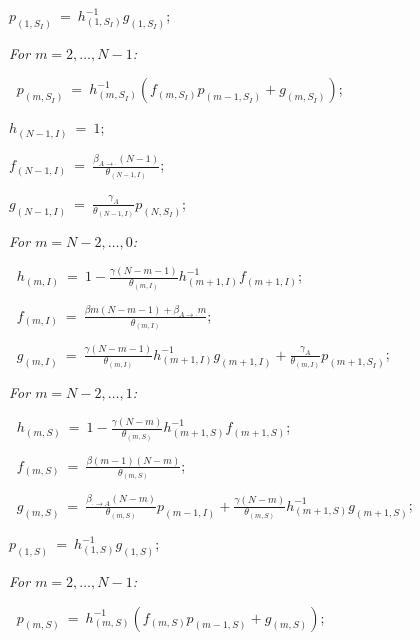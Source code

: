 \documentclass[10pt,A4paper]{article}
\begin{document}
\begin{minipage}{9cm}
\begin{description}
  \item $p_{(1,S_I)} ~=~ h_{(1,S_I)}^{-1}g_{(1,S_I)}$;
  \item \it For $m=2,\dots,N-1$:
  \item $~$\hspace{0.5cm} $p_{(m,S_I)} ~=~ h_{(m,S_I)}^{-1}\left(f_{(m,S_I)}p_{(m-1,S_I)}+g_{(m,S_I)}\right)$;
  \item $h_{(N-1,I)} ~=~ 1$;
  \item $f_{(N-1,I)} ~=~ \frac{\beta_{A\rightarrow\cdot}(N-1)}{\theta_{(N-1,I)}}$;
  \item $g_{(N-1,I)} ~=~ \frac{\gamma_A}{\theta_{(N-1,I)}}p_{(N,S_I)}$;
  \item \it For $m=N-2,\dots,0$:
  \item $~$\hspace{0.5cm} $h_{(m,I)} ~=~ 1-\frac{\gamma(N-m-1)}{\theta_{(m,I)}}h_{(m+1,I)}^{-1}f_{(m+1,I)}$;
  \item $~$\hspace{0.5cm} $f_{(m,I)} ~=~ \frac{\beta m(N-m-1)+\beta_{A\rightarrow\cdot}m}{\theta_{(m,I)}}$;
  \item $~$\hspace{0.5cm} $g_{(m,I)} ~=~ \frac{\gamma (N-m-1)}{\theta_{(m,I)}}h_{(m+1,I)}^{-1}g_{(m+1,I)}+\frac{\gamma_A}{\theta_{(m,I)}}p_{(m+1,S_I)}$;
\end{description}
\end{minipage}\begin{minipage}{9cm}
\begin{description}
  \item \it For $m=N-2,\dots,1$:
  \item $~$\hspace{0.5cm} $h_{(m,S)} ~=~ 1-\frac{\gamma(N-m)}{\theta_{(m,S)}}h_{(m+1,S)}^{-1}f_{(m+1,S)}$;
  \item $~$\hspace{0.5cm} $f_{(m,S)} ~=~ \frac{\beta (m-1)(N-m)}{\theta_{(m,S)}}$;
  \item $~$\hspace{0.5cm} $g_{(m,S)} ~=~ \frac{\beta_{\cdot\rightarrow A}(N-m)}{\theta_{(m,S)}}p_{(m-1,I)}+\frac{\gamma(N-m)}{\theta_{(m,S)}}h_{(m+1,S)}^{-1}g_{(m+1,S)}$;
  \item $p_{(1,S)} ~=~ h_{(1,S)}^{-1}g_{(1,S)}$;
  \item \it For $m=2,\dots,N-1$:
  \item $~$\hspace{0.5cm} $p_{(m,S)} ~=~ h_{(m,S)}^{-1}\left(f_{(m,S)}p_{(m-1,S)}+g_{(m,S)}\right)$;
  \item $~$
  \item $~$
  \item $~$
  \item $~$
\end{description}
\end{minipage}
\end{document}
